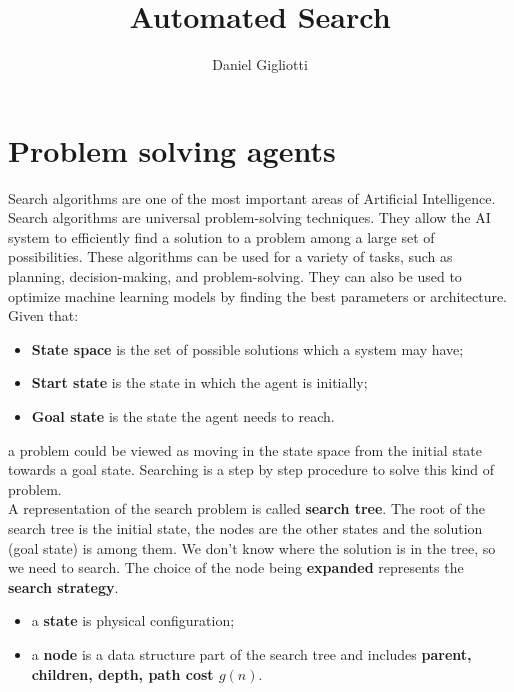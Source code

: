 \documentclass{article}
\title{Automated Search}
\author{Daniel Gigliotti}
\date{}
\begin{document}
\maketitle

\section{Problem solving agents}

Search algorithms are one of the most important areas of Artificial Intelligence.\\ 

Search algorithms are universal problem-solving techniques. They allow the AI system to efficiently find a solution to a problem among a large set of possibilities. These algorithms can be used for a variety of tasks, such as planning, decision-making, and problem-solving. They can also be used to optimize machine learning models by finding the best parameters or architecture. \\

Given that:

\begin{center}
    \begin{itemize}
        \item \textbf{State space} is the set of possible solutions which a system may have;
        \item \textbf{Start state} is the state in which the agent is initially;
        \item \textbf{Goal state} is the state the agent needs to reach.
    \end{itemize}
\end{center}

a problem could be viewed as moving in the state space from the initial state towards a goal state. Searching is a step by step procedure to solve this kind of problem. \\

A representation of the search problem is called \textbf{search tree}. The root of the search tree is the initial state, the nodes are the other states and the solution (goal state) is among them. We don't know where the solution is in the tree, so we need to search. The choice of the node being \textbf{expanded} represents the \textbf{search strategy}. \\

\begin{itemize}
    \item a \textbf{state} is physical configuration;
    \item a \textbf{node} is a data structure part of the search tree and includes \textbf{parent, children, depth, path cost $g(n)$}. 
\end{itemize}
\end{document}
